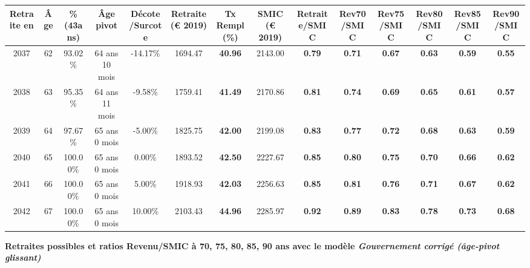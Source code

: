 \begin{adjustbox}{max width=\textwidth} 
\begin{tabular}[htb]{|c|c||c|c|c||c|c||c||c|c|c|c|c|c|} 
\hline 
 Retraite en &  Âge &  \%(43ans) &  Âge pivot &  Décote/Surcote &  Retraite (\euro{} 2019) &  Tx Rempl(\%) &  SMIC (\euro{} 2019) &  Retraite/SMIC &  Rev70/SMIC &  Rev75/SMIC &  Rev80/SMIC &  Rev85/SMIC &  Rev90/SMIC \\ 
\hline \hline 
 2037 &  62 &  93.02\% &  64 ans 10 mois &  -14.17\% &  1694.47 &  {\bf 40.96} &  2143.00 &  {\bf {\color{red} 0.79}} &  {\bf {\color{red} 0.71}} &  {\bf {\color{red} 0.67}} &  {\bf {\color{red} 0.63}} &  {\bf {\color{red} 0.59}} &  {\bf {\color{red} 0.55}} \\ 
\hline 
 2038 &  63 &  95.35\% &  64 ans 11 mois &  -9.58\% &  1759.41 &  {\bf 41.49} &  2170.86 &  {\bf {\color{red} 0.81}} &  {\bf {\color{red} 0.74}} &  {\bf {\color{red} 0.69}} &  {\bf {\color{red} 0.65}} &  {\bf {\color{red} 0.61}} &  {\bf {\color{red} 0.57}} \\ 
\hline 
 2039 &  64 &  97.67\% &  65 ans 0 mois &  -5.00\% &  1825.75 &  {\bf 42.00} &  2199.08 &  {\bf {\color{red} 0.83}} &  {\bf {\color{red} 0.77}} &  {\bf {\color{red} 0.72}} &  {\bf {\color{red} 0.68}} &  {\bf {\color{red} 0.63}} &  {\bf {\color{red} 0.59}} \\ 
\hline 
 2040 &  65 &  100.00\% &  65 ans 0 mois &  0.00\% &  1893.52 &  {\bf 42.50} &  2227.67 &  {\bf {\color{red} 0.85}} &  {\bf {\color{red} 0.80}} &  {\bf {\color{red} 0.75}} &  {\bf {\color{red} 0.70}} &  {\bf {\color{red} 0.66}} &  {\bf {\color{red} 0.62}} \\ 
\hline 
 2041 &  66 &  100.00\% &  65 ans 0 mois &  5.00\% &  1918.93 &  {\bf 42.03} &  2256.63 &  {\bf {\color{red} 0.85}} &  {\bf {\color{red} 0.81}} &  {\bf {\color{red} 0.76}} &  {\bf {\color{red} 0.71}} &  {\bf {\color{red} 0.67}} &  {\bf {\color{red} 0.62}} \\ 
\hline 
 2042 &  67 &  100.00\% &  65 ans 0 mois &  10.00\% &  2103.43 &  {\bf 44.96} &  2285.97 &  {\bf {\color{red} 0.92}} &  {\bf {\color{red} 0.89}} &  {\bf {\color{red} 0.83}} &  {\bf {\color{red} 0.78}} &  {\bf {\color{red} 0.73}} &  {\bf {\color{red} 0.68}} \\ 
\hline 
\hline 
\end{tabular} 
\end{adjustbox} 
 
 \vspace{0.1cm} 
{\bf \noindent Retraites possibles et ratios Revenu/SMIC à 70, 75, 80, 85, 90 ans avec le modèle \emph{Gouvernement corrigé (âge-pivot glissant)}}  
 
